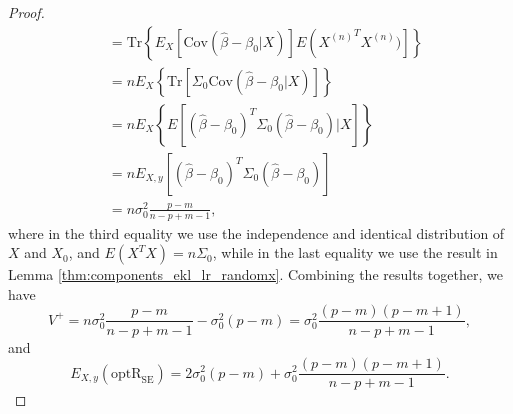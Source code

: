 \begin{proof}
\begin{equation*}
\begin{aligned}
&= \text{Tr} \left\{ E_X\left[ \text{Cov} \left( \hat{\beta} -\beta_0 \big | X \right) \right] E \left ({X^{(n)}}^T X^{(n)}) \right] \right\}\\
&= n E_X \left\{ \text{Tr} \left[ \Sigma_0 \text{Cov} \left( \hat{\beta} - \beta_0  \big | X \right) \right] \right\}\\
&= n E_X \left\{ E\left[ \left(\hat{\beta} - \beta_0 \right)^T \Sigma_0 \left(\hat{\beta} - \beta_0 \right) \big| X \right] \right\} \\
&= n E_{X,y} \left[ \left(\hat{\beta} - \beta_0 \right)^T \Sigma_0 \left(\hat{\beta} - \beta_0 \right) \right]\\
&= n \sigma_0^2 \frac{p-m}{n-p+m-1},
\end{aligned}
\end{equation*}
where in the third equality we use the independence and identical distribution of $X$ and $X_0$, and $E(X^T X) = n\Sigma_0$, while in the last equality we use the result in Lemma \ref{thm:components_ekl_lr_randomx}. Combining the results together, we have
\begin{equation*}
V^+ = n\sigma_0^2 \frac{p-m}{n-p+m-1} - \sigma_0^2 (p-m) = \sigma_0^2\frac{(p-m)(p-m+1)}{n-p+m-1},
\end{equation*}
and 
\begin{equation*}
E_{X,y}(\text{optR}_\text{SE}) = 2\sigma_0^2 (p-m) + \sigma_0^2\frac{(p-m)(p-m+1)}{n-p+m-1}.
\end{equation*}

\end{proof}

